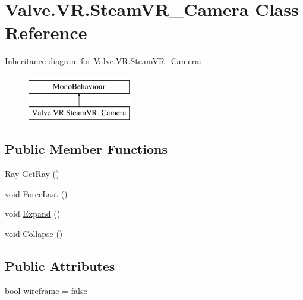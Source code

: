 \hypertarget{class_valve_1_1_v_r_1_1_steam_v_r___camera}{}\section{Valve.\+V\+R.\+Steam\+V\+R\+\_\+\+Camera Class Reference}
\label{class_valve_1_1_v_r_1_1_steam_v_r___camera}
Inheritance diagram for Valve.\+V\+R.\+Steam\+V\+R\+\_\+\+Camera\+:\begin{figure}[H]
\begin{center}
\leavevmode
\includegraphics[height=2.000000cm]{class_valve_1_1_v_r_1_1_steam_v_r___camera}
\end{center}
\end{figure}
\subsection*{Public Member Functions}
\begin{DoxyCompactItemize}
\item 
Ray \mbox{\hyperlink{class_valve_1_1_v_r_1_1_steam_v_r___camera_acd583d324147b6fef955692923d387ab}{Get\+Ray}} ()
\item 
void \mbox{\hyperlink{class_valve_1_1_v_r_1_1_steam_v_r___camera_ae7382a4a9bdc196f3fdba43bf4801083}{Force\+Last}} ()
\item 
void \mbox{\hyperlink{class_valve_1_1_v_r_1_1_steam_v_r___camera_a51e94885e2b2c73ec9da4716f8de0bc5}{Expand}} ()
\item 
void \mbox{\hyperlink{class_valve_1_1_v_r_1_1_steam_v_r___camera_a60ba8f4bceae007fb9f41702669346c1}{Collapse}} ()
\end{DoxyCompactItemize}
\subsection*{Public Attributes}
\begin{DoxyCompactItemize}
\item 
bool \mbox{\hyperlink{class_valve_1_1_v_r_1_1_steam_v_r___camera_aa80e0ab2f8d29c70051bc23f7cef9937}{wireframe}} = false
\end{DoxyCompactItemize}
